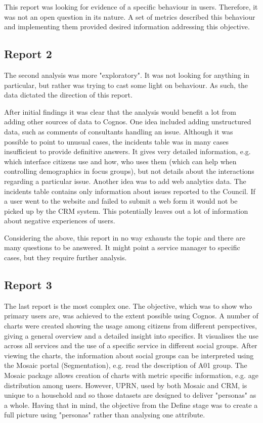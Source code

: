 This report was looking for evidence of a specific behaviour in users. Therefore, it was not an open question in its nature. A set of metrics described this behaviour and implementing them provided desired information addressing this objective.
		
		\subsection{Report 2}
		
The second analysis was more "exploratory". It was not looking for anything in particular, but rather was trying to cast some light on behaviour. As such, the data dictated the direction of this report.

After initial findings it was clear that the analysis would benefit a lot from adding other sources of data to Cognos. One idea included adding unstructured data, such as comments of consultants handling an issue. Although it was possible to point to unusual cases, the incidents table was in many cases insufficient to provide definitive answers. It gives very detailed information, e.g. which interface citizens use and how, who uses them (which can help when controlling demographics in focus groups), but not details about the interactions regarding a particular issue. Another idea was to add web analytics data. The incidents table contains only information about issues reported to the Council. If a user went to the website and failed to submit a web form it would not be picked up by the CRM system. This potentially leaves out a lot of information about negative experiences of users.

Considering the above, this report in no way exhausts the topic and there are many questions to be answered. It might point a service manager to specific cases, but they require further analysis.
		
		\subsection{Report 3}
		
The last report is the most complex one. The objective, which was to show who primary users are, was achieved to the extent possible using Cognos. A number of charts were created showing the usage among citizens from different perspectives, giving a general overview and a detailed insight into specifics. It visualises the use across all services and the use of a specific service in different social groups. After viewing the charts, the information about social groups can be interpreted using the Mosaic portal (Segmentation), e.g. read the description of A01 group. The Mosaic package allows creation of charts with metric specific information, e.g. age distribution among users. However, UPRN, used by both Mosaic and CRM, is unique to a household and so those datasets are designed to deliver "personas" as a whole. Having that in mind, the objective from the Define stage was to create a full picture using "personas" rather than analysing one attribute.

